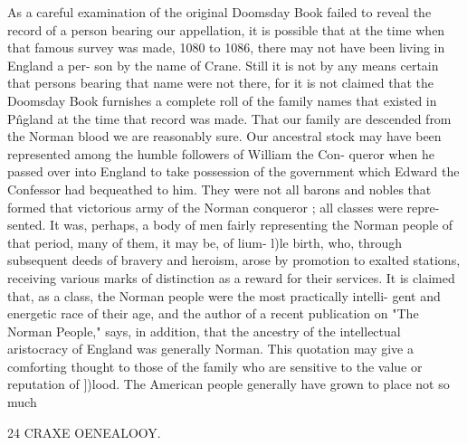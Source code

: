 \documentclass{book}
\begin{document}
As a careful examination of the original Doomsday Book failed 
to reveal the record of a person bearing our appellation, it is 
possible that at the time when that famous survey was made, 
1080 to 1086, there may not have been living in England a per- 
son by the name of Crane. Still it is not by any means certain 
that persons bearing that name were not there, for it is not 
claimed that the Doomsday Book furnishes a complete roll of the 
family names that existed in P\^ngland at the time that record was 
made. That our family are descended from the Norman blood 
we are reasonably sure. Our ancestral stock may have been 
represented among the humble followers of William the Con- 
queror when he passed over into England to take possession of 
the government which Edward the Confessor had bequeathed to 
him. They were not all barons and nobles that formed that 
victorious army of the Norman conqueror ; all classes were repre- 
sented. It was, perhaps, a body of men fairly representing the 
Norman people of that period, many of them, it may be, of lium- 
l)le birth, who, through subsequent deeds of bravery and heroism, 
arose by promotion to exalted stations, receiving various marks 
of distinction as a reward for their services. It is claimed that, 
as a class, the Norman people were the most practically intelli- 
gent and energetic race of their age, and the author of a recent 
publication on "The Norman People," says, in addition, that the 
ancestry of the intellectual aristocracy of England was generally 
Norman. This quotation may give a comforting thought to those 
of the family who are sensitive to the value or reputation of ])lood. 
The American people generally have grown to place not so much 



24 CRAXE OENEALOOY. 
\end{document}
